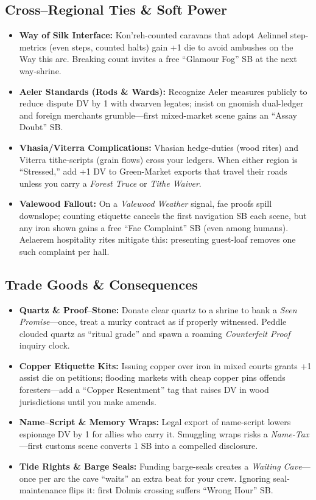 \subsection*{Cross–Regional Ties \& Soft Power}
\begin{itemize}
  \item \textbf{Way of Silk Interface:} Kon’reh-counted caravans that adopt Aelinnel step-metrics (even steps, counted halts) gain +1 die to avoid ambushes on the Way this arc. Breaking count invites a free “Glamour Fog” SB at the next way-shrine.
  \item \textbf{Aeler Standards (Rods \& Wards):} Recognize Aeler measures publicly to reduce dispute DV by 1 with dwarven legates; insist on gnomish dual-ledger and foreign merchants grumble—first mixed-market scene gains an “Assay Doubt” SB.
  \item \textbf{Vhasia/Viterra Complications:} Vhasian hedge-duties (wood rites) and Viterra tithe-scripts (grain flows) cross your ledgers. When either region is “Stressed,” add +1 DV to Green-Market exports that travel their roads unless you carry a \emph{Forest Truce} or \emph{Tithe Waiver}.
  \item \textbf{Valewood Fallout:} On a \emph{Valewood Weather} signal, fae proofs spill downslope; counting etiquette cancels the first navigation SB each scene, but any iron shown gains a free “Fae Complaint” SB (even among humans). Aelaerem hospitality rites mitigate this: presenting guest-loaf removes one such complaint per hall.
\end{itemize}

\subsection*{Trade Goods \& Consequences}
\begin{itemize}
  \item \textbf{Quartz \& Proof–Stone:} Donate clear quartz to a shrine to bank a \emph{Seen Promise}—once, treat a murky contract as if properly witnessed. Peddle clouded quartz as “ritual grade” and spawn a roaming \emph{Counterfeit Proof} inquiry clock.
  \item \textbf{Copper Etiquette Kits:} Issuing copper over iron in mixed courts grants +1 assist die on petitions; flooding markets with cheap copper pins offends foresters—add a “Copper Resentment” tag that raises DV in wood jurisdictions until you make amends.
  \item \textbf{Name–Script \& Memory Wraps:} Legal export of name-script lowers espionage DV by 1 for allies who carry it. Smuggling wraps risks a \emph{Name-Tax}—first customs scene converts 1 SB into a compelled disclosure.
  \item \textbf{Tide Rights \& Barge Seals:} Funding barge-seals creates a \emph{Waiting Cave}—once per arc the cave “waits” an extra beat for your crew. Ignoring seal-maintenance flips it: first Dolmis crossing suffers “Wrong Hour” SB.
\end{itemize}

